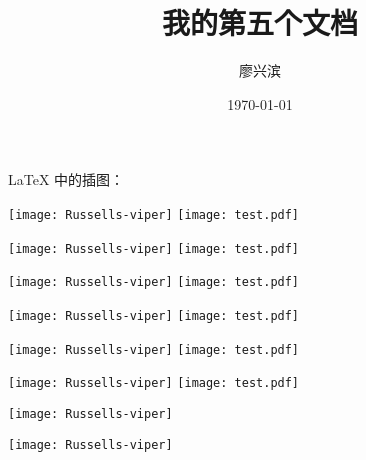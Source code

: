 \documentclass{article} %
\title{\heiti 我的第五个文档}
\author{\kaishu 廖兴滨}
\date{\today}
\begin{document}
	\LaTeX{} 中的插图：
		
	\texttt{[image: Russells-viper]}
	\texttt{[image: test.pdf]}
	
	\texttt{[image: Russells-viper]}
	\texttt{[image: test.pdf]}
	
	
	\texttt{[image: Russells-viper]}
	\texttt{[image: test.pdf]}
	
	\texttt{[image: Russells-viper]}
	\texttt{[image: test.pdf]}
	
	\texttt{[image: Russells-viper]}
	\texttt{[image: test.pdf]}
	
	\texttt{[image: Russells-viper]}
	\texttt{[image: test.pdf]}
	
	\texttt{[image: Russells-viper]}
	
	\texttt{[image: Russells-viper]}
	
\end{document}
